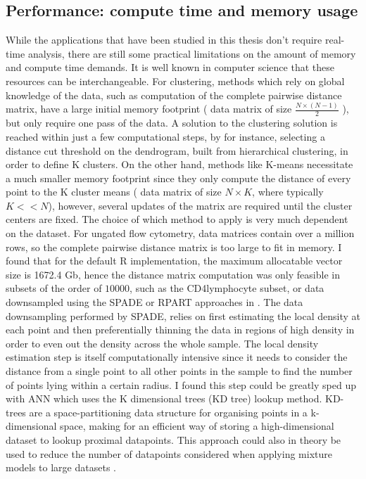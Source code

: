 \subsection{Performance: compute time and memory usage}
While the applications that have been studied in this thesis don’t require real-time analysis, there are still some practical limitations on the amount of memory and compute time demands.
It is well known in computer science that these resources can be interchangeable.
For clustering, methods which rely on global knowledge of the data, such as computation of the complete pairwise distance matrix, have a large initial memory footprint ( data matrix of size $\frac{N \times (N-1)}{2}$ ), but only require one pass of the data.
A solution to the clustering solution is reached within just a few computational steps, by for instance,
selecting a distance cut threshold on the dendrogram, built from hierarchical clustering, in order to define K clusters. 
On the other hand, methods like K-means necessitate a much smaller memory footprint since they only compute the distance of every point to the K cluster means ( data matrix of size $N \times K$, where typically $K << N$), however, several updates of the matrix are required until the cluster centers are fixed.
The choice of which method to apply is very much dependent on the dataset.
For ungated flow cytometry, data matrices  contain over a million rows, so the complete pairwise distance matrix is too large to fit in memory.
I found that for the default R implementation, the maximum allocatable vector size is 1672.4 Gb, hence the distance matrix computation was only feasible in subsets of the order of $10000$, such as the CD4\positive lymphocyte subset, or data downsampled using the SPADE or RPART approaches in .
The data downsampling performed by SPADE, relies on first estimating the local density at each point and then preferentially thinning the data in regions of high density in order to even out the density across the whole sample.
The local density estimation step is itself computationally intensive since it needs to consider the distance from a single point to all other points in the sample to find the number of points lying within a certain radius.
I found this step could be greatly sped up with \acrfull{ANN} which uses the K dimensional trees (KD tree) lookup method.
KD-trees are a space-partitioning data structure for organising points in a k-dimensional space, making for an efficient way of storing a high-dimensional dataset to lookup proximal datapoints.
This approach could also in theory be used to reduce the number of datapoints considered when applying mixture models to large datasets \citep{McLachlan:2004uw}.

